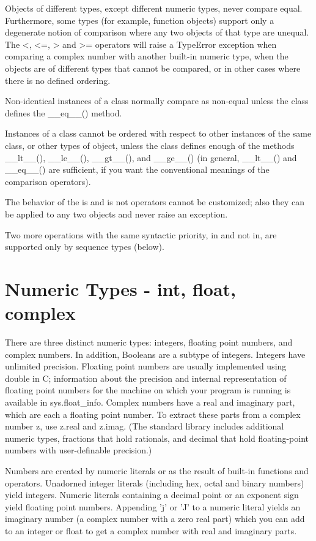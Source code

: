 Objects of different types, except different numeric types, never compare equal. Furthermore, some types (for example, function objects) support only a degenerate notion of comparison where any two objects of that type are unequal. The <, <=, > and >= operators will raise a TypeError exception when comparing a complex number with another built-in numeric type, when the objects are of different types that cannot be compared, or in other cases where there is no defined ordering.

Non-identical instances of a class normally compare as non-equal unless the class defines the \_\_eq\_\_() method.

Instances of a class cannot be ordered with respect to other instances of the same class, or other types of object, unless the class defines enough of the methods \_\_lt\_\_(), \_\_le\_\_(), \_\_gt\_\_(), and \_\_ge\_\_() (in general, \_\_lt\_\_() and \_\_eq\_\_() are sufficient, if you want the conventional meanings of the comparison operators).

The behavior of the is and is not operators cannot be customized; also they can be applied to any two objects and never raise an exception.

Two more operations with the same syntactic priority, in and not in, are supported only by sequence types (below).


\section{Numeric Types - int, float, complex}

There are three distinct numeric types: integers, floating point numbers, and complex numbers. In addition, Booleans are a subtype of integers. Integers have unlimited precision. Floating point numbers are usually implemented using double in C; information about the precision and internal representation of floating point numbers for the machine on which your program is running is available in sys.float\_info. Complex numbers have a real and imaginary part, which are each a floating point number. To extract these parts from a complex number z, use z.real and z.imag. (The standard library includes additional numeric types, fractions that hold rationals, and decimal that hold floating-point numbers with user-definable precision.)

\vpara
Numbers are created by numeric literals or as the result of built-in functions and operators. Unadorned integer literals (including hex, octal and binary numbers) yield integers. Numeric literals containing a decimal point or an exponent sign yield floating point numbers. Appending 'j' or 'J' to a numeric literal yields an imaginary number (a complex number with a zero real part) which you can add to an integer or float to get a complex number with real and imaginary parts.


